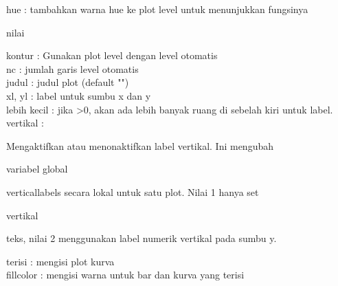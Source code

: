 \documentclass{article}
\begin{document}
\begin{eulernotebook}
\begin{eulercomment}
\begin{eulercomment}
\begin{eulercomment}
\begin{eulercomment}
\begin{eulercomment}
\begin{eulercomment}
\begin{eulercomment}
\begin{eulercomment}
\begin{eulercomment}
\begin{eulercomment}
\begin{eulercomment}
\begin{eulercomment}
\begin{eulercomment}
\begin{eulercomment}
\begin{eulercomment}
\begin{eulercomment}
\begin{eulercomment}
\begin{eulercomment}
\begin{eulercomment}
\begin{eulercomment}
\begin{eulercomment}
\begin{eulercomment}
\begin{eulercomment}
\begin{eulercomment}
\begin{eulercomment}
\begin{eulercomment}
\begin{eulercomment}
\begin{eulercomment}
\begin{eulercomment}
hue          : tambahkan warna hue ke plot level untuk menunjukkan
fungsinya\\
\end{eulercomment}
\begin{eulerttcomment}
            nilai
\end{eulerttcomment}
\begin{eulercomment}
kontur       : Gunakan plot level dengan level otomatis\\
nc           : jumlah garis level otomatis\\
judul        : judul plot (default "")\\
xl, yl       : label untuk sumbu x dan y\\
lebih kecil  : jika \textgreater{}0, akan ada lebih banyak ruang di sebelah kiri
untuk label.\\
vertikal     :\\
\end{eulercomment}
\begin{eulerttcomment}
  Mengaktifkan atau menonaktifkan label vertikal. Ini mengubah
\end{eulerttcomment}
\begin{eulercomment}
variabel global\\
\end{eulercomment}
\begin{eulerttcomment}
  verticallabels secara lokal untuk satu plot. Nilai 1 hanya set
\end{eulerttcomment}
\begin{eulercomment}
vertikal\\
\end{eulercomment}
\begin{eulerttcomment}
  teks, nilai 2 menggunakan label numerik vertikal pada sumbu y.
\end{eulerttcomment}
\begin{eulercomment}
terisi       : mengisi plot kurva\\
fillcolor    : mengisi warna untuk bar dan kurva yang terisi\\

\end{eulercomment}
\end{eulercomment}
\end{eulercomment}
\end{eulercomment}
\end{eulercomment}
\end{eulercomment}
\end{eulercomment}
\end{eulercomment}
\end{eulercomment}
\end{eulercomment}
\end{eulercomment}
\end{eulercomment}
\end{eulercomment}
\end{eulercomment}
\end{eulercomment}
\end{eulercomment}
\end{eulercomment}
\end{eulercomment}
\end{eulercomment}
\end{eulercomment}
\end{eulercomment}
\end{eulercomment}
\end{eulercomment}
\end{eulercomment}
\end{eulercomment}
\end{eulercomment}
\end{eulercomment}
\end{eulercomment}
\end{eulercomment}
\end{eulernotebook}
\end{document}
